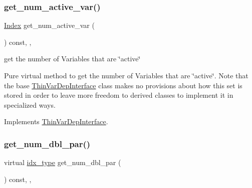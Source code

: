 \subsubsection{\texorpdfstring{get\+\_\+num\+\_\+active\+\_\+var()}{get\_num\_active\_var()}}
{\footnotesize\ttfamily \mbox{\hyperlink{group___thin_var_dep_interface___c_l_a_s_s_e_s_gad53d6229d7ec28555a9c9c2fd9abf773}{Index}} get\+\_\+num\+\_\+active\+\_\+var (\begin{DoxyParamCaption}\item[{void}]{ }\end{DoxyParamCaption}) const\hspace{0.3cm}{\ttfamily [inline]}, {\ttfamily [override]}, {\ttfamily [virtual]}}



get the number of Variables that are \char`\"{}active\char`\"{} 

Pure virtual method to get the number of Variables that are \char`\"{}active\char`\"{}. Note that the base \mbox{\hyperlink{class_s_m_spp__di__unipi__it_1_1_thin_var_dep_interface}{Thin\+Var\+Dep\+Interface}} class makes no provisions about how this set is stored in order to leave more freedom to derived classes to implement it in specialized ways. 

Implements \mbox{\hyperlink{group___thin_var_dep_interface___c_l_a_s_s_e_s_ga6dbf09c17736b358d11f617e15856981}{Thin\+Var\+Dep\+Interface}}.

\mbox{\label{class_s_m_spp__di__unipi__it_1_1_f_row_constraint_a842fd454acaded84baf6b77e0d61a950}} 
\subsubsection{\texorpdfstring{get\+\_\+num\+\_\+dbl\+\_\+par()}{get\_num\_dbl\_par()}}
{\footnotesize\ttfamily virtual \mbox{\hyperlink{class_s_m_spp__di__unipi__it_1_1_thin_compute_interface_aa3d710629ad8c434286726ad810c3b47}{idx\+\_\+type}} get\+\_\+num\+\_\+dbl\+\_\+par (\begin{DoxyParamCaption}\item[{void}]{ }\end{DoxyParamCaption}) const\hspace{0.3cm}{\ttfamily [inline]}, {\ttfamily [override]}, {\ttfamily [virtual]}}



